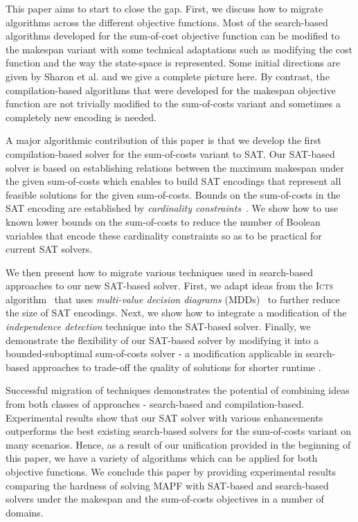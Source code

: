 \documentclass[jair,oneside,11pt]{article}
\begin{document}
This paper aims to start to close the gap. First, we discuss how to migrate
algorithms across the different objective functions. Most of the search-based
algorithms developed for the sum-of-cost objective function can be modified to
the makespan variant with some technical adaptations such as modifying the cost
function and the way the state-space is represented. Some initial directions
are given by  Sharon et al. \citeyear{CBSJUR} and we give a complete picture here. 
By contrast, the compilation-based algorithms that were developed for the
makespan objective function are not trivially modified to the sum-of-costs
variant and sometimes a completely new encoding is needed.

A major algorithmic contribution of this paper is that we develop the first compilation-based solver
for the sum-of-costs variant to SAT. Our SAT-based solver is based on establishing relations between
the maximum makespan under the given sum-of-costs which enables to build SAT encodings that represent
all feasible solutions for the given sum-of-costs. Bounds on the sum-of-costs in the SAT encoding are established by
{\em cardinality constraints}~\cite{DBLP:conf/cp/BailleuxB03,DBLP:conf/cp/SilvaL07}. We show how to use known
lower bounds on the sum-of-costs to reduce the number of Boolean variables that encode these cardinality constraints so as to be practical for current SAT solvers.

We then present how to migrate various techniques used in search-based approaches to our new SAT-based solver.
First, we adapt ideas from the \textsc{Icts} algorithm~\cite{DBLP:journals/ai/SharonSGF13} that uses {\em multi-value decision diagrams} (MDDs)~\cite{DBLP:conf/iccad/SrinivasanKMB90} to further
reduce the size of SAT encodings. Next, we show how to integrate a modification of the {\em independence detection} technique \cite{DBLP:conf/aaai/Standley10} into the SAT-based solver. Finally, we demonstrate the flexibility of our SAT-based solver by modifying it into a bounded-suboptimal sum-of-costs solver - a modification applicable in search-based approaches to trade-off the quality of solutions for shorter runtime \cite{DBLP:conf/ecai/BarerSSF14}.

Successful migration of techniques demonstrates the potential of combining ideas from
both classes of approaches - search-based and compilation-based. Experimental results
show that our SAT solver with various enhancements outperforms the best existing search-based
solvers for the sum-of-costs variant on many scenarios.
Hence, as a result of our unification provided in the beginning of this paper,
we have a variety of algorithms which can be applied for both objective
functions. We conclude this paper by providing experimental results comparing
the hardness of solving MAPF with SAT-based and search-based solvers under the
makespan and the sum-of-costs objectives in a number of domains.
\end{document}
